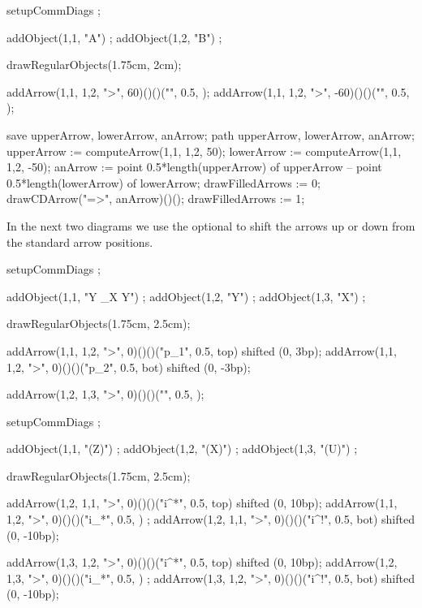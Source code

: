 \startbuffer
\startformula{}
  setupCommDiags ;
  
  addObject(1,1, "A") ;
  addObject(1,2, "B") ;
  
  drawRegularObjects(1.75cm, 2cm);
  
  addArrow(1,1, 1,2, ">",  60)()()("", 0.5, );
  addArrow(1,1, 1,2, ">", -60)()()("", 0.5, );
  
  save upperArrow, lowerArrow, anArrow;
  path upperArrow, lowerArrow, anArrow;
  upperArrow := computeArrow(1,1, 1,2,  50);
  lowerArrow := computeArrow(1,1, 1,2, -50);
  anArrow    := 
    point 0.5*length(upperArrow) of upperArrow --
    point 0.5*length(lowerArrow) of lowerArrow;
  drawFilledArrows := 0;
  drawCDArrow("=>", anArrow)()();
  drawFilledArrows := 1;
\stopMPcode\stopformula
\stopbuffer

\processTEXbuffer

\typebuffer

In the next two diagrams we use the optional  
to shift the arrows up or down from the standard arrow positions. 

\startbuffer
\startformula{}
  setupCommDiags ;
  
  addObject(1,1, "Y \times_X Y") ;
  addObject(1,2, "Y") ;
  addObject(1,3, "X") ;
    
  drawRegularObjects(1.75cm, 2.5cm);
  
  addArrow(1,1, 1,2, ">", 0)()()("p_1", 0.5, top) shifted (0, 3bp);
  addArrow(1,1, 1,2, ">", 0)()()("p_2", 0.5, bot) shifted (0, -3bp);
  
  addArrow(1,2, 1,3, ">", 0)()()("", 0.5, );
\stopMPcode\stopformula
\stopbuffer

\processTEXbuffer

\typebuffer

\blank[2*big]

\startbuffer
\startformula{}
  setupCommDiags ;
  
  addObject(1,1, "(Z)") ;
  addObject(1,2, "(X)") ;
  addObject(1,3, "(U)") ;
    
  drawRegularObjects(1.75cm, 2.5cm);
  
  addArrow(1,2, 1,1, ">", 0)()()("i^*", 0.5, top) shifted (0, 10bp);
  addArrow(1,1, 1,2, ">", 0)()()("i_*", 0.5,    ) ;
  addArrow(1,2, 1,1, ">", 0)()()("i^!", 0.5, bot) shifted (0, -10bp);
  
  addArrow(1,3, 1,2, ">", 0)()()("i^*", 0.5, top) shifted (0, 10bp);
  addArrow(1,2, 1,3, ">", 0)()()("i_*", 0.5,    ) ;
  addArrow(1,3, 1,2, ">", 0)()()("i^!", 0.5, bot) shifted (0, -10bp);
\stopMPcode\stopformula
\stopbuffer

